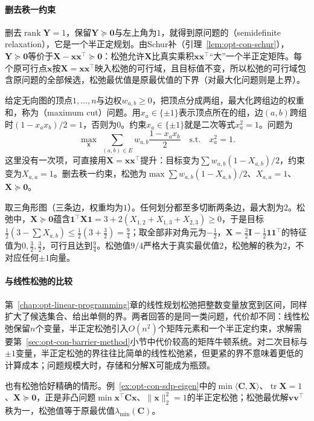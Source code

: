 \paragraph{删去秩一约束}
删去$\operatorname{rank}\bm Y=1$，保留$\bm Y\succeq\bm0$与左上角为$1$，就得到原问题的（semidefinite relaxation），它是一个半正定规划。由Schur补（引理~\ref{lem:opt-con-schur}），$\bm Y\succeq\bm0$等价于$\bm X-\bm x\bm x^\top\succeq\bm0$：松弛允许$\bm X$比真实乘积$\bm x\bm x^\top$“大”一个半正定矩阵。每个原可行点$\bm x$按$\bm X=\bm x\bm x^\top$映入松弛的可行域，且目标值不变，所以松弛的可行域包含原问题的全部候选，松弛最优值是原最优值的下界（对最大化问题则是上界）。

\begin{example}[最大割的半正定松弛]
\label{ex:opt-con-maxcut}
给定无向图的顶点$1,\dots,n$与边权$w_{a,b}\geq0$，把顶点分成两组，最大化跨组边的权重和，称为（maximum cut）问题。用$x_a\in\{\pm1\}$表示顶点所在的组，边$(a,b)$跨组时$(1-x_ax_b)/2=1$，否则为$0$。约束$x_a\in\{\pm1\}$就是二次等式$x_a^2=1$。问题为
\[
  \max_{\bm x}\ \sum_{(a,b)\in E}w_{a,b}\frac{1-x_ax_b}{2}\quad\text{s.t.}\quad x_a^2=1.
\]
这里没有一次项，可直接用$\bm X=\bm x\bm x^\top$提升：目标变为$\sum w_{a,b}(1-X_{a,b})/2$，约束变为$X_{a,a}=1$。删去秩一约束，松弛为$\max\sum w_{a,b}(1-X_{a,b})/2$、$X_{a,a}=1$、$\bm X\succeq\bm0$。

取三角形图（三条边，权重均为$1$）。任何划分都至多切断两条边，最大割为$2$。松弛中，$\bm X\succeq\bm0$蕴含$\bm1^\top\bm X\bm1=3+2(X_{1,2}+X_{1,3}+X_{2,3})\geq0$，于是目标$\frac12(3-\sum X_{a,b})\leq\frac12(3+\frac32)=\frac94$；取全部非对角元为$-\frac12$，$\bm X=\frac32\bm I-\frac12\bm1\bm1^\top$的特征值为$0,\frac32,\frac32$，可行且达到$\frac94$。松弛值$9/4$严格大于真实最优值$2$，松弛解的秩为$2$，不对应任何$\pm1$向量。
\end{example}

\paragraph{与线性松弛的比较}
第~\ref{chap:opt-linear-programming}章的线性规划松弛把整数变量放宽到区间，同样扩大了候选集合、给出单侧的界。两者回答的是同一类问题，代价却不同：线性松弛保留$n$个变量，半正定松弛引入$O(n^2)$个矩阵元素和一个半正定约束，求解需要第~\ref{sec:opt-con-barrier-method}小节中代价较高的矩阵牛顿系统。对二次目标与$\pm1$变量，半正定松弛的界往往比简单的线性松弛紧，但更紧的界不意味着更低的计算成本；问题规模大时，存储和分解$\bm X$可能成为瓶颈。

也有松弛恰好精确的情形。例~\ref{ex:opt-con-sdp-eigen}中的$\min\langle\bm C,\bm X\rangle$、$\operatorname{tr}\bm X=1$、$\bm X\succeq\bm0$，正是非凸问题$\min\bm x^\top\bm C\bm x$、$\lVert\bm x\rVert_2^2=1$的半正定松弛；松弛最优解$\bm v\bm v^\top$秩为一，松弛值等于原最优值$\lambda_{\min}(\bm C)$。


